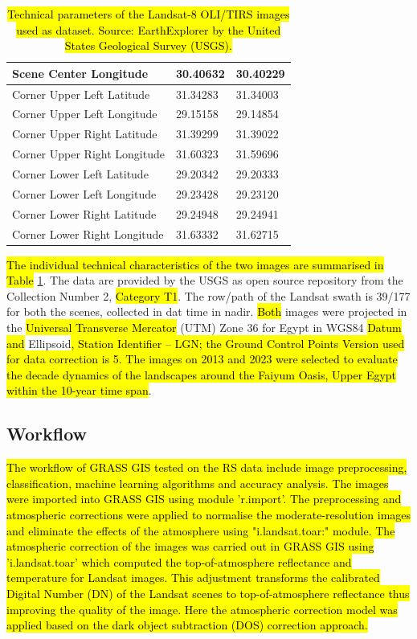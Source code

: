 \documentclass[final,5p,times,twocolumn]{elsarticle}
\begin{document}
\begin{table}[t]
{\begin{tabular}{|l|l|l|}
        Scene Center Longitude & 30.40632 & 30.40229 \\ \hline
        Corner Upper Left Latitude & 31.34283 & 31.34003 \\ \hline
        Corner Upper Left Longitude & 29.15158 & 29.14854 \\ \hline
        Corner Upper Right Latitude & 31.39299 & 31.39022 \\ \hline
        Corner Upper Right Longitude & 31.60323 & 31.59696 \\ \hline
        Corner Lower Left Latitude & 29.20342 & 29.20333 \\ \hline
        Corner Lower Left Longitude & 29.23428 & 29.23120 \\ \hline
        Corner Lower Right Latitude & 29.24948 & 29.24941 \\ \hline
        Corner Lower Right Longitude & 31.63332 & 31.62715 \\ \hline
    \end{tabular}
    \caption{\hl{Technical parameters of the Landsat-8 OLI/TIRS images used as dataset. Source: EarthExplorer by the United States Geological Survey (USGS).}}
    }
    \label{tab01}
\end{table}

\hl{The individual technical characteristics of the two images are summarised in Table} \ref{tab01}. The data are provided by the USGS as open source repository from the Collection Number 2, \hl{Category T1}. The row/path of the Landsat swath is 39/177 for both the scenes, collected in dat time in nadir. \hl{Both} images were projected in the \hl{Universal Transverse Mercator} (UTM) Zone 36 for Egypt in WGS84 \hl{Datum and }Ellipsoid\hl{, Station Identifier -- LGN; the Ground Control Points Version used for data correction is 5. The images on 2013 and 2023 were selected to evaluate the decade dynamics of the landscapes around the Faiyum Oasis, Upper Egypt within the 10-year time span}. 

\subsection{Workflow}

\hl{The workflow of GRASS GIS tested on the RS data include image preprocessing, classification, machine learning algorithms and accuracy analysis. The images were imported into GRASS GIS using module 'r.import'. The preprocessing and atmospheric corrections were applied to normalise the moderate-resolution images and eliminate the effects of the atmosphere using "i.landsat.toar:" module. The atmospheric correction of the images was carried out in GRASS GIS using 'i.landsat.toar' which computed the top-of-atmosphere reflectance and temperature for Landsat images. This adjustment transforms the calibrated Digital Number (DN) of the Landsat scenes to top-of-atmosphere reflectance thus improving the quality of the image. Here the atmospheric correction model was applied based on the dark object subtraction (DOS) correction approach.}
\end{document}
